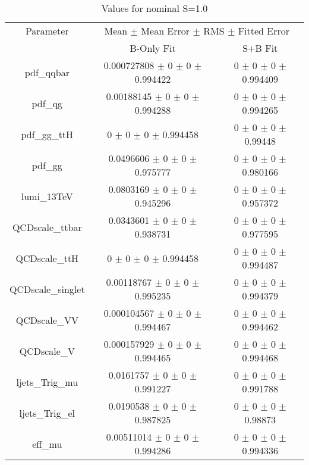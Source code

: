 \begin{table}
\centering
\caption{Values for nominal S=1.0}
\begin{tabular}{ccc}
\toprule
Parameter & \multicolumn{2}{c}{Mean $\pm$ Mean Error $\pm$ RMS $\pm$ Fitted Error}\\
 & B-Only Fit & S+B Fit\\
\midrule
pdf\_qqbar & \num{0.000727808} $\pm$ \num{0} $\pm$ \num{0} $\pm$ \num{0.994422} & \num{0} $\pm$ \num{0} $\pm$ \num{0} $\pm$ \num{0.994409}\\
pdf\_qg & \num{0.00188145} $\pm$ \num{0} $\pm$ \num{0} $\pm$ \num{0.994288} & \num{0} $\pm$ \num{0} $\pm$ \num{0} $\pm$ \num{0.994265}\\
pdf\_gg\_ttH & \num{0} $\pm$ \num{0} $\pm$ \num{0} $\pm$ \num{0.994458} & \num{0} $\pm$ \num{0} $\pm$ \num{0} $\pm$ \num{0.99448}\\
pdf\_gg & \num{0.0496606} $\pm$ \num{0} $\pm$ \num{0} $\pm$ \num{0.975777} & \num{0} $\pm$ \num{0} $\pm$ \num{0} $\pm$ \num{0.980166}\\
lumi\_13TeV & \num{0.0803169} $\pm$ \num{0} $\pm$ \num{0} $\pm$ \num{0.945296} & \num{0} $\pm$ \num{0} $\pm$ \num{0} $\pm$ \num{0.957372}\\
QCDscale\_ttbar & \num{0.0343601} $\pm$ \num{0} $\pm$ \num{0} $\pm$ \num{0.938731} & \num{0} $\pm$ \num{0} $\pm$ \num{0} $\pm$ \num{0.977595}\\
QCDscale\_ttH & \num{0} $\pm$ \num{0} $\pm$ \num{0} $\pm$ \num{0.994458} & \num{0} $\pm$ \num{0} $\pm$ \num{0} $\pm$ \num{0.994487}\\
QCDscale\_singlet & \num{0.00118767} $\pm$ \num{0} $\pm$ \num{0} $\pm$ \num{0.995235} & \num{0} $\pm$ \num{0} $\pm$ \num{0} $\pm$ \num{0.994379}\\
QCDscale\_VV & \num{0.000104567} $\pm$ \num{0} $\pm$ \num{0} $\pm$ \num{0.994467} & \num{0} $\pm$ \num{0} $\pm$ \num{0} $\pm$ \num{0.994462}\\
QCDscale\_V & \num{0.000157929} $\pm$ \num{0} $\pm$ \num{0} $\pm$ \num{0.994465} & \num{0} $\pm$ \num{0} $\pm$ \num{0} $\pm$ \num{0.994468}\\
ljets\_Trig\_mu & \num{0.0161757} $\pm$ \num{0} $\pm$ \num{0} $\pm$ \num{0.991227} & \num{0} $\pm$ \num{0} $\pm$ \num{0} $\pm$ \num{0.991788}\\
ljets\_Trig\_el & \num{0.0190538} $\pm$ \num{0} $\pm$ \num{0} $\pm$ \num{0.987825} & \num{0} $\pm$ \num{0} $\pm$ \num{0} $\pm$ \num{0.98873}\\
eff\_mu & \num{0.00511014} $\pm$ \num{0} $\pm$ \num{0} $\pm$ \num{0.994286} & \num{0} $\pm$ \num{0} $\pm$ \num{0} $\pm$ \num{0.994336}\\

\end{tabular}
\end{table}
